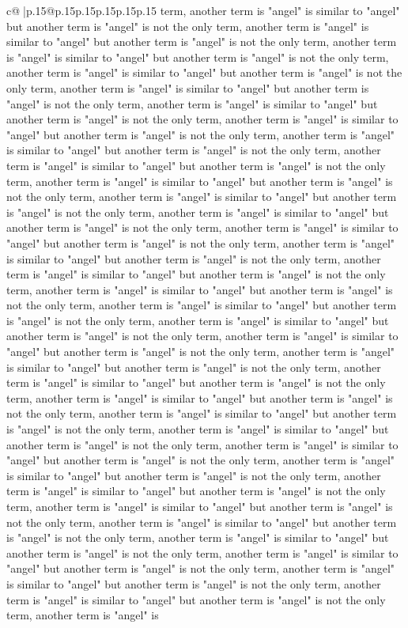 \documentclass{article}
\begin{document}
{\begin{supertabular}{c@{$\;$}|p{.15\linewidth}@{}p{.15\linewidth}p{.15\linewidth}p{.15\linewidth}p{.15\linewidth}p{.15\linewidth}}
{{{term, another term is "angel" is similar to "angel" but another term is "angel" is not the only term, another term is "angel" is similar to "angel" but another term is "angel" is not the only term, another term is "angel" is similar to "angel" but another term is "angel" is not the only term, another term is "angel" is similar to "angel" but another term is "angel" is not the only term, another term is "angel" is similar to "angel" but another term is "angel" is not the only term, another term is "angel" is similar to "angel" but another term is "angel" is not the only term, another term is "angel" is similar to "angel" but another term is "angel" is not the only term, another term is "angel" is similar to "angel" but another term is "angel" is not the only term, another term is "angel" is similar to "angel" but another term is "angel" is not the only term, another term is "angel" is similar to "angel" but another term is "angel" is not the only term, another term is "angel" is similar to "angel" but another term is "angel" is not the only term, another term is "angel" is similar to "angel" but another term is "angel" is not the only term, another term is "angel" is similar to "angel" but another term is "angel" is not the only term, another term is "angel" is similar to "angel" but another term is "angel" is not the only term, another term is "angel" is similar to "angel" but another term is "angel" is not the only term, another term is "angel" is similar to "angel" but another term is "angel" is not the only term, another term is "angel" is similar to "angel" but another term is "angel" is not the only term, another term is "angel" is similar to "angel" but another term is "angel" is not the only term, another term is "angel" is similar to "angel" but another term is "angel" is not the only term, another term is "angel" is similar to "angel" but another term is "angel" is not the only term, another term is "angel" is similar to "angel" but another term is "angel" is not the only term, another term is "angel" is similar to "angel" but another term is "angel" is not the only term, another term is "angel" is similar to "angel" but another term is "angel" is not the only term, another term is "angel" is similar to "angel" but another term is "angel" is not the only term, another term is "angel" is similar to "angel" but another term is "angel" is not the only term, another term is "angel" is similar to "angel" but another term is "angel" is not the only term, another term is "angel" is similar to "angel" but another term is "angel" is not the only term, another term is "angel" is similar to "angel" but another term is "angel" is not the only term, another term is "angel" is similar to "angel" but another term is "angel" is not the only term, another term is "angel" is similar to "angel" but another term is "angel" is not the only term, another term is "angel" is similar to "angel" but another term is "angel" is not the only term, another term is "angel" is similar to "angel" but another term is "angel" is not the only term, another term is "angel" is similar to "angel" but another term is "angel" is not the only term, another term is "angel" is }}}
\end{supertabular}}
\end{document}
